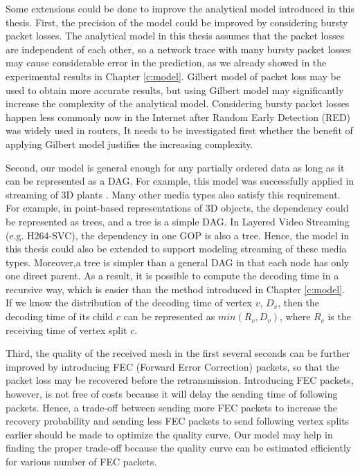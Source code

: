 Some extensions could be done to improve the analytical model introduced 
in this thesis. 
First, the precision of the model could be improved by considering bursty packet losses.
The analytical model in this thesis assumes that the packet losses 
are independent of each other, so a network trace with many bursty packet losses
may cause considerable error in the prediction,
as we already showed in the experimental results in Chapter \ref{c:model}. 
Gilbert model of packet loss may be used to obtain more accurate results, 
but using Gilbert model may significantly increase the complexity of the analytical model. 
Considering bursty packet losses happen less commonly now in the Internet after 
Random Early Detection (RED) \cite{floyd:random} was widely used in routers, 
It needs to be investigated first whether the benefit of applying Gilbert model justifies
the increasing complexity.

Second, our model is general enough for any partially ordered data 
as long as it can be represented as a DAG.
For example, this model was successfully applied in streaming of 3D plants \cite{plant:seb, compact:mondet}.
Many other media types also satisfy this requirement. For example, 
in point-based representations of 3D objects, the dependency could be represented as trees, 
and a tree is a simple DAG. 
In Layered Video Streaming (e.g. H264-SVC), the dependency in one GOP is also a tree. 
Hence, the model in this thesis could also be extended to support modeling streaming of these media types.
Moreover,a tree is simpler than a general DAG in that each node has only one direct parent. 
As a result, it is possible to compute the decoding time in a recursive way, 
which is easier than the method introduced in Chapter \ref{c:model}.
If we know the distribution of the decoding time of vertex $v$, $D_v$, then the decoding time of its child $c$ can 
be represented as $min(R_c, D_v)$, where $R_c$ is the receiving time of vertex split $c$.

Third, the quality of the received mesh in the first several seconds
can be further improved by introducing FEC (Forward Error Correction) packets,
so that the packet loss may be recovered before the retransmission. %
Introducing FEC packets, however, is not free of costs because it will delay the sending time of following packets. 
Hence, a trade-off between sending
more FEC packets to increase the recovery probability 
and sending less FEC packets to send following vertex splits
earlier 
should be made to optimize the quality curve. 
Our model may help in finding the proper trade-off because the 
quality curve can be estimated efficiently for various number of FEC packets.


